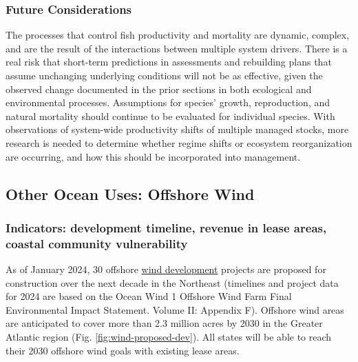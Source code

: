\documentclass[
  10pt,
]{article}
\begin{document}
\hypertarget{future-considerations-2}{%
\subsubsection{Future Considerations}\label{future-considerations-2}}

The processes that control fish productivity and mortality are dynamic, complex, and are the result of the interactions between multiple system drivers. There is a real risk that short-term predictions in assessments and rebuilding plans that assume unchanging underlying conditions will not be as effective, given the observed change documented in the prior sections in both ecological and environmental processes. Assumptions for species' growth, reproduction, and natural mortality should continue to be evaluated for individual species. With observations of system-wide productivity shifts of multiple managed stocks, more research is needed to determine whether regime shifts or ecosystem reorganization are occurring, and how this should be incorporated into management.

\hypertarget{other-ocean-uses-offshore-wind}{%
\subsection{Other Ocean Uses: Offshore Wind}\label{other-ocean-uses-offshore-wind}}

\hypertarget{indicators-development-timeline-revenue-in-lease-areas-coastal-community-vulnerability}{%
\subsubsection{Indicators: development timeline, revenue in lease areas, coastal community vulnerability}\label{indicators-development-timeline-revenue-in-lease-areas-coastal-community-vulnerability}}

As of January 2024, 30 offshore \href{https://noaa-edab.github.io/catalog/wind_dev_speed.html}{wind development} projects are proposed for construction over the next decade in the Northeast (timelines and project data for 2024 are based on the Ocean Wind 1 Offshore Wind Farm Final Environmental Impact Statement. Volume II: Appendix F). Offshore wind areas are anticipated to cover more than 2.3 million acres by 2030 in the Greater Atlantic region (Fig. \ref{fig:wind-proposed-dev}). All states will be able to reach their 2030 offshore wind goals with existing lease areas.\\
\end{document}
